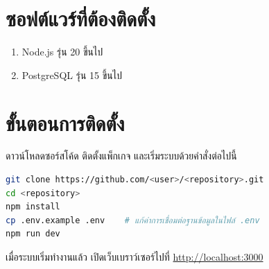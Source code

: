 \section{ซอฟต์แวร์ที่ต้องติดตั้ง}

\begin{enumerate}
  \item Node.js รุ่น 20 ขึ้นไป
  \item PostgreSQL รุ่น 15 ขึ้นไป
\end{enumerate}

\section{ขั้นตอนการติดตั้ง}

ดาวน์โหลดซอร์สโค้ด ติดตั้งแพ็กเกจ และเริ่มระบบด้วยคำสั่งต่อไปนี้

\begin{lstlisting}[language=bash, deletekeywords={env}, numbers=none]
git clone https://github.com/<user>/<repository>.git
cd <repository>
npm install
cp .env.example .env    # แก้ค่าการเชื่อมต่อฐานข้อมูลในไฟล์ .env
npm run dev
\end{lstlisting}

เมื่อระบบเริ่มทำงานแล้ว เปิดเว็บเบราว์เซอร์ไปที่ \url{http://localhost:3000}
